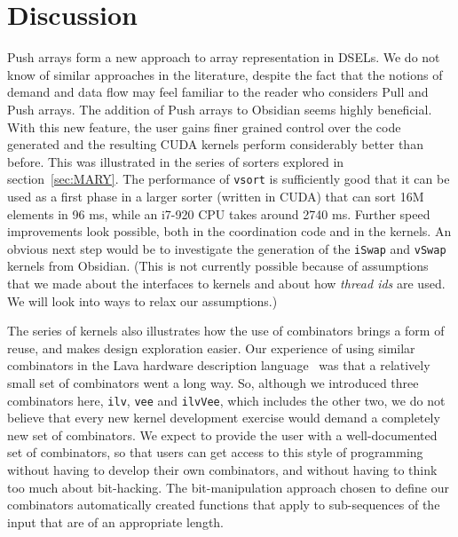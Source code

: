 
\section {Discussion}


Push arrays form a new approach to array representation in DSELs.
We do not know of similar approaches in the literature, despite
the fact that the notions of demand and data flow
may feel familiar to the reader who considers Pull and Push arrays.
The addition of Push arrays to Obsidian seems highly beneficial. With 
this new feature, the user gains finer grained control over the code generated
and the resulting CUDA kernels perform considerably better than before.
This 
was illustrated in the series of sorters explored in section~\ref{sec:MARY}.
The performance of {\tt vsort} is sufficiently good that it
can be used as a first phase in a larger sorter (written in CUDA) that
can sort 16M elements in 96 ms, while an i7-920 CPU takes
around 2740 ms. Further speed improvements look possible, both in the coordination code
and in the kernels. An obvious next step would be to investigate the generation of the {\tt iSwap} and
{\tt vSwap} kernels from Obsidian. (This is not currently possible because of assumptions that we made about the interfaces to kernels and about how {\em thread ids} are used. We will look into ways to relax
our assumptions.)

The series of kernels also illustrates how the use of combinators brings a form of reuse, and makes design exploration easier. Our experience of using similar combinators in the Lava hardware
description language~\cite{LavaSorter} was that a relatively small set of combinators went a long way. So, although we introduced three
combinators here, {\tt ilv}, {\tt vee} and {\tt ilvVee}, which
includes the other two, we do not believe that every new kernel development exercise would demand a completely new set of combinators.
We expect to provide the user with a well-documented set of combinators,
so that users can get access to this style of programming without having
to develop their own combinators, and without having to think too much
about bit-hacking.
The bit-manipulation approach chosen to define our combinators automatically
created functions that apply to sub-sequences of the input that
are of an appropriate length.

